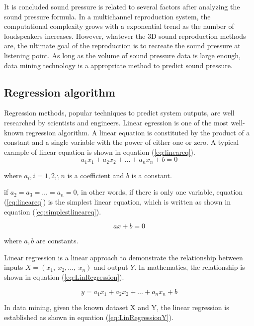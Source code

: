 \documentclass[runningheads,a4paper]{llncs}
\begin{document}
It is concluded sound pressure is related to several factors after analyzing the sound pressure formula. In a multichannel reproduction system, the computational complexity grows with a exponential trend as the number of loudspeakers increases. However, whatever the 3D sound reproduction methods are, the ultimate goal of the reproduction is to recreate the sound pressure at listening point. As long as the volume of sound pressure data is large enough, data mining technology is a appropriate method to predict sound pressure.


\subsection{Regression algorithm}
Regression methods, popular techniques to predict system outputs, are well researched by scientists and engineers. Linear egression is one of the most well-known regression algorithm\cite{Hahne14Linear}\cite{Peter15The}. A linear equation is constituted by the product of a constant and  a single variable with the power of either one or zero. A typical example of linear equation is shown in equation (\ref{eq:lineareq}).
\begin{equation}\label{eq:lineareq}
    a_1x_1+a_2x_2+\dots+a_nx_n+b=0 
\end{equation}

where $ a_i,i=1,2,\dot,n $ is a coefficient and $b$ is a constant. 

if $a_2=a_3=\dots=a_n=0$, in other words, if there is only one variable, equation (\ref{eq:lineareq}) is the simplest linear equation, which is written as shown in equation (\ref{eq:simplestlineareq}).

\begin{equation}\label{eq:simplestlineareq}
    ax+b=0 
\end{equation}

where $ a, b$ are constants. 

Linear regression is a linear approach to demonstrate the relationship between inputs $X=(x_1,\ x_2, \dots, \  x_n)$ and output $Y$. In mathematics, the relationship is shown in equation (\ref{eq:LinRegression}).

\begin{equation}\label{eq:LinRegression}
    y=a_1x_1+a_2x_2+\dots+a_nx_n+b
\end{equation}\label{eq:LinRegression}

In data mining, given the known dataset X and Y, the linear regression is established as shown in equation (\ref{eq:LinRegressionY}).
\end{document}
